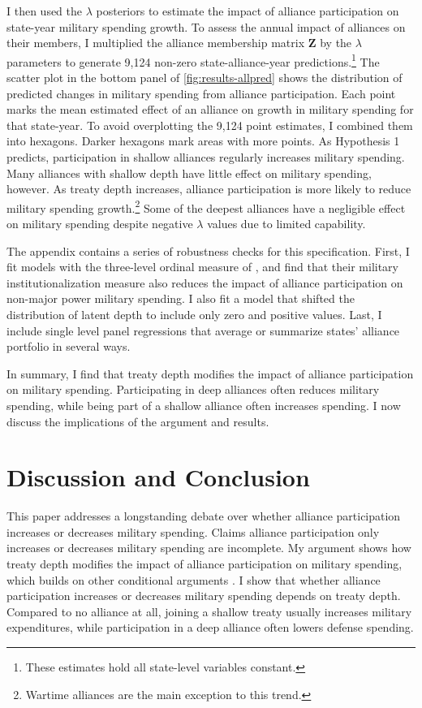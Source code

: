 \documentclass[12pt]{article}
\begin{document}
I then used the $\lambda$ posteriors to estimate the impact of alliance participation on state-year military spending growth. 
To assess the annual impact of alliances on their members, I multiplied the alliance membership matrix $\textbf{Z}$ by the $\lambda$ parameters to generate 9,124 non-zero state-alliance-year predictions.\footnote{These estimates hold all state-level variables constant.} 
The scatter plot in the bottom panel of \autoref{fig:results-allpred} shows the distribution of predicted changes in military spending from alliance participation.
Each point marks the mean estimated effect of an alliance on growth in military spending for that state-year.
To avoid overplotting the 9,124 point estimates, I combined them into hexagons. 
Darker hexagons mark areas with more points. 
As Hypothesis 1 predicts, participation in shallow alliances regularly increases military spending. 
Many alliances with shallow depth have little effect on military spending, however. 
As treaty depth increases, alliance participation is more likely to reduce military spending growth.\footnote{Wartime alliances are the main exception to this trend.}
Some of the deepest alliances have a negligible effect on military spending despite negative $\lambda$ values due to limited capability. 


The appendix contains a series of robustness checks for this specification.
First, I fit models with the three-level ordinal measure of \citep{LeedsAnac2005}, and find that their military institutionalization measure also reduces the impact of alliance participation on non-major power military spending. 
I also fit a model that shifted the distribution of latent depth to include only zero and positive values. 
Last, I include single level panel regressions that average or summarize states' alliance portfolio in several ways. 


In summary, I find that treaty depth modifies the impact of alliance participation on military spending.  
Participating in deep alliances often reduces military spending, while being part of a shallow alliance often increases spending. 
I now discuss the implications of the argument and results. 



\section{Discussion and Conclusion}


This paper addresses a longstanding debate over whether alliance participation increases or decreases military spending. 
Claims alliance participation only increases or decreases military spending are incomplete. 
My argument shows how treaty depth modifies the impact of alliance participation on military spending, which builds on other conditional arguments \citep{DigiuseppePoast2016}. 
I show that whether alliance participation increases or decreases military spending depends on treaty depth. 
Compared to no alliance at all, joining a shallow treaty usually increases military expenditures, while participation in a deep alliance often lowers defense spending. 
\end{document}
